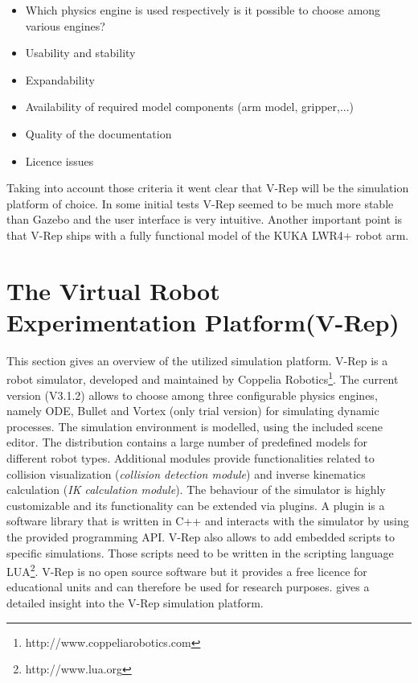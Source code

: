 \begin{itemize}
\item
Which physics engine is used respectively is it possible to choose among various engines?
\item
Usability and stability
\item
Expandability
\item
Availability of required model components (arm model, gripper,...)
\item
Quality of the documentation
\item
Licence issues
\end{itemize}

Taking into account those criteria it went clear that V-Rep will be the simulation platform of choice. In some initial tests V-Rep seemed to be much more stable than Gazebo and the user interface is very intuitive. Another important point is that V-Rep ships with a fully functional model of the KUKA LWR4+ robot arm.

\section{The Virtual Robot Experimentation Platform(V-Rep)}

This section gives an overview of the utilized simulation platform. V-Rep is a robot simulator, developed and maintained by Coppelia Robotics\footnote{http://www.coppeliarobotics.com}. The current version (V3.1.2) allows to choose among three configurable physics engines, namely ODE, Bullet and Vortex (only trial version) for simulating dynamic processes. The simulation environment is modelled, using the included scene editor. The distribution contains a large number of predefined models for different robot types. Additional modules provide functionalities related to collision visualization (\emph{collision detection module}) and inverse kinematics calculation (\emph{IK calculation module}). The behaviour of the simulator is highly customizable and its functionality can be extended via plugins. A plugin is a software library that is written in C++ and interacts with the simulator by using the provided programming API. V-Rep also allows to add embedded scripts to specific simulations. Those scripts need to be written in the scripting language LUA\footnote{http://www.lua.org}. V-Rep is no open source software but it provides a free licence for educational units and can therefore be used for research purposes. \cite{freese2013} gives a detailed insight into the V-Rep simulation platform.

